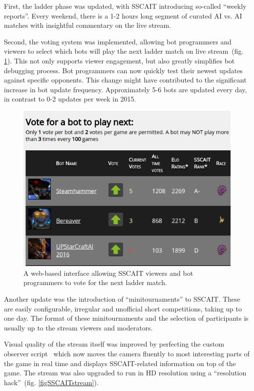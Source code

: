 First, the ladder phase was updated, with SSCAIT introducing so-called ``weekly reports''. Every weekend, there is a 1-2 hours long segment of curated AI vs. AI matches with insightful commentary on the live stream.  

Second, the voting system was implemented, allowing bot programmers and viewers to select which bots will play the next ladder match on live stream~(fig. \ref{figSSCAITvoting}). This not only supports viewer engagement, but also greatly simplifies bot debugging process. Bot programmers can now quickly test their newest updates against specific opponents. This change might have contributed to the significant increase in bot update frequency. Approximately 5-6 bots are updated every day, in contrast to 0-2 updates per week in 2015.

\begin{figure}[h]
  \centering
  \includegraphics[width=1\columnwidth]{fig/sscait-voting.png}
  \caption{A web-based interface allowing SSCAIT viewers and bot programmers to vote for the next ladder match.}
  \label{figSSCAITvoting}
\end{figure}

Another update was the introduction of ``minitournaments'' to SSCAIT. These are easily configurable, irregular and unofficial short competitions, taking up to one day. The format of these minitournaments and the selection of participants is usually up to the stream viewers and moderators. 

Visual quality of the stream itself was improved by perfecting the custom observer script~\cite{mattsson2015automatic} which now moves the camera fluently to most interesting parts of the game in real time and displays SSCAIT-related information on top of the game. The stream was also upgraded to run in HD resolution using a ``resolution hack''~(fig. \ref{figSSCAITstream}).


